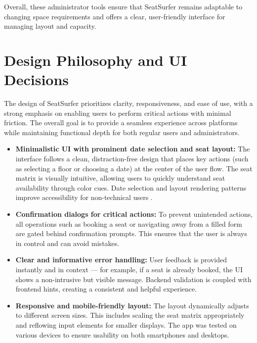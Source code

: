 \documentclass[12pt,a4paper]{report} %
\begin{document}
Overall, these administrator tools ensure that SeatSurfer remains adaptable to changing space requirements and offers a clear, user-friendly interface for managing layout and capacity.

\section{Design Philosophy and UI Decisions}

The design of SeatSurfer prioritizes clarity, responsiveness, and ease of use, with a strong emphasis on enabling users to perform critical actions with minimal friction. The overall goal is to provide a seamless experience across platforms while maintaining functional depth for both regular users and administrators.

\begin{itemize}
    \item \textbf{Minimalistic UI with prominent date selection and seat layout:}  
    The interface follows a clean, distraction-free design that places key actions (such as selecting a floor or choosing a date) at the center of the user flow. The seat matrix is visually intuitive, allowing users to quickly understand seat availability through color cues. Date selection and layout rendering patterns improve accessibility for non-technical users \cite{santos2022uxpatterns}.

    \item \textbf{Confirmation dialogs for critical actions:}  
    To prevent unintended actions, all operations such as booking a seat or navigating away from a filled form are gated behind confirmation prompts. This ensures that the user is always in control and can avoid mistakes.

    \item \textbf{Clear and informative error handling:}  
    User feedback is provided instantly and in context — for example, if a seat is already booked, the UI shows a non-intrusive but visible message. Backend validation is coupled with frontend hints, creating a consistent and helpful experience.

    \item \textbf{Responsive and mobile-friendly layout:}  
    The layout dynamically adjusts to different screen sizes. This includes scaling the seat matrix appropriately and reflowing input elements for smaller displays. The app was tested on various devices to ensure usability on both smartphones and desktops.
\end{itemize}
\end{document}
